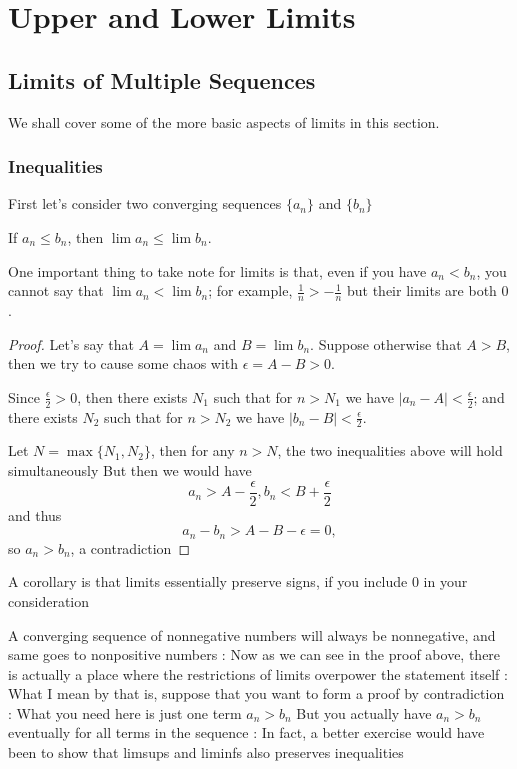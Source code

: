 \section{Upper and Lower Limits}


\subsection{Limits of Multiple Sequences}
We shall cover some of the more basic aspects of limits in this section.

\subsubsection{Inequalities}

First let's consider two converging sequences $\{a_n\}$ and $\{b_n\}$

If $a_n \le b_n$, then $\lim a_n \le \lim b_n$.

\begin{remark}
One important thing to take note for limits is that, even if you have $a_n<b_n$, you cannot say that $\lim a_n<\lim b_n$; for example, $\frac{1}{n}>-\frac{1}{n}$ but their limits are both $0$.
\end{remark}

\begin{proof}
Let's say that $A=\lim a_n$ and $B=\lim b_n$. Suppose otherwise that $A>B$, then we try to cause some chaos with $\epsilon=A-B>0$.

Since $\frac{\epsilon}{2}>0$, then there exists $N_1$ such that for $n>N_1$ we have $|a_n-A|<\frac{\epsilon}{2}$; and there exists $N_2$ such that for $n>N_2$ we have $|b_n-B|<\frac{\epsilon}{2}$.

Let $N=\max\{N_1,N_2\}$, then for any $n>N$, the two inequalities above will hold simultaneously
But then we would have
\[ a_n>A-\frac{\epsilon}{2}, b_n<B+\frac{\epsilon}{2} \]
and thus
\[ a_n-b_n>A-B-\epsilon=0, \]
so $a_n>b_n$, a contradiction
\end{proof}

A corollary is that limits essentially preserve signs, if you include 0 in your consideration

A converging sequence of nonnegative numbers will always be nonnegative, and same goes to nonpositive numbers
:
Now as we can see in the proof above, there is actually a place where the restrictions of limits overpower the statement itself
:
What I mean by that is, suppose that you want to form a proof by contradiction
:
What you need here is just one term $a_n>b_n$
But you actually have $a_n>b_n$ eventually for all terms in the sequence
:
In fact, a better exercise would have been to show that limsups and liminfs also preserves inequalities

